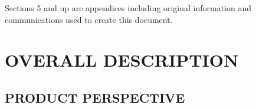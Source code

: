 \documentclass[letterpaper, 10pt, draftclsnofoot, onecolumn]{IEEEtran}
\begin{document}
\bigskip

{\color{black}
Sections 5 and up are appendices including original information and
communications used to create this document.}




\clearpage\section[OVERALL
DESCRIPTION]{\rmfamily\bfseries\color{black}
OVERALL DESCRIPTION}

\subsection[PRODUCT
PERSPECTIVE]{\rmfamily\bfseries\color{black}
PRODUCT PERSPECTIVE}
\end{document}
